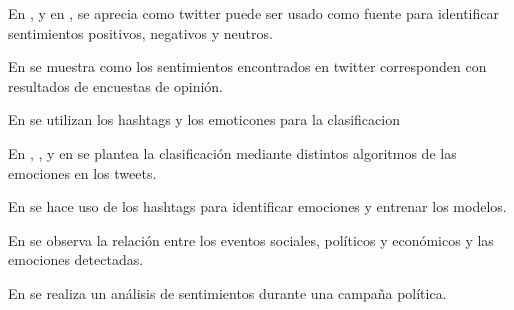 En \cite{pak2010twitter}, \cite{kouloumpis2011twitter} y en \cite{go2009twitter}, \cite{barbosa2010robust} se aprecia como twitter puede ser usado como fuente para identificar sentimientos positivos, negativos y neutros.

En \cite{o2010tweets} se muestra como los sentimientos encontrados en twitter corresponden con resultados de encuestas de opinión.

En \cite{davidov2010enhanced} se utilizan los hashtags y los emoticones para la clasificacion


En \cite{hasan2014emotex}, , \cite{wang2012harnessing}y en \cite{roberts2012empatweet} se plantea la clasificación mediante distintos algoritmos de las emociones en los tweets.

En \cite{mohammad2012emotional} se hace uso de los hashtags para identificar emociones y entrenar los modelos.

En \cite{bollen2011modeling} se observa la relación entre los eventos sociales, políticos y económicos y las emociones detectadas.

En \cite{tumasjan2010predicting} se realiza un análisis de sentimientos durante una campaña política.






